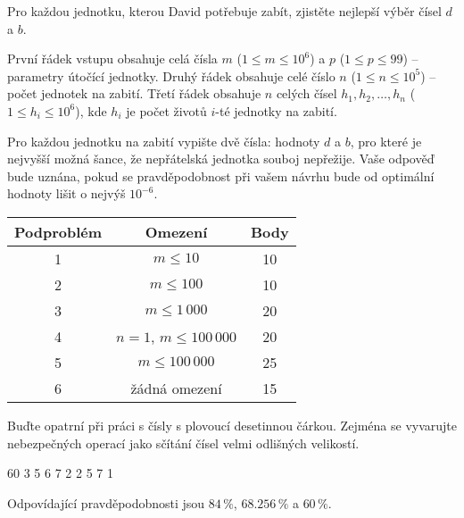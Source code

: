 
Pro každou jednotku, kterou David potřebuje zabít, zjistěte nejlepší výběr čísel $d$ a $b$.


První řádek vstupu obsahuje celá čísla $m$ ($1\leq m\leq 10^6$)
a $p$ ($1\leq p\leq 99$) -- parametry útočící jednotky.
Druhý řádek obsahuje celé číslo $n$ ($1\leq n\leq 10^5$) -- počet jednotek na zabití.
Třetí řádek obsahuje $n$ celých čísel $h_1,h_2,\dots,h_n$ ($1\leq h_i\leq 10^6$),
kde $h_i$ je počet životů $i$-té jednotky na zabití.



Pro každou jednotku na zabití vypište dvě čísla: hodnoty $d$ a $b$, pro které je nejvyšší možná
šance, že nepřátelská jednotka souboj nepřežije. Vaše odpověď bude uznána, pokud se pravděpodobnost
při vašem návrhu bude od optimální hodnoty lišit o nejvýš $10^{-6}$.


\begin{tabular}{|c|c|c|}
	\hline
	Podproblém & Omezení  & Body \\
	\hline
	1 & $m \leq 10$ & 10 \\
	\hline
	2 & $m \leq 100$ & 10 \\
	\hline
	3 & $m \leq 1\,000$ & 20 \\
	\hline
	4 & $n=1$, $m\leq 100\,000$ & 20 \\
	\hline
	5 & $m \leq 100\,000$ & 25 \\
	\hline
	6 & žádná omezení & 15 \\
	\hline
\end{tabular}


Buďte opatrní při práci s čísly s plovoucí desetinnou čárkou.
Zejména se vyvarujte nebezpečných operací jako sčítání čísel velmi odlišných velikostí.


 60
3
5 6 7
 2
2 5
7 1

\sampleEND

Odpovídající pravděpodobnosti jsou $84\,\%$, $68.256\,\%$ a $60\,\%$.

